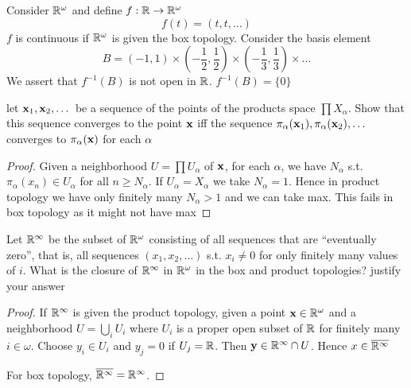 \documentclass[11pt]{article}
\begin{document}
\begin{examplle}[]
Consider \(\mathbb{R}^\omega\) and define \(f:\mathbb{R}\to\mathbb{R}^\omega\)
\begin{equation*}
f(t)=(t,t,\dots)
\end{equation*}
\(f\) is continuous if \(\mathbb{R}^\omega\) is given the box topology. Consider the basis element
\begin{equation*}
B=(-1,1)\times(-\frac{1}{2},\frac{1}{2})\times(-\frac{1}{3},\frac{1}{3})\times\dots
\end{equation*}
We assert that \(f^{-1}(B)\) is not open in \(\mathbb{R}\). \(f^{-1}(B)=\{0\}\)
\end{examplle}

\begin{exercise}
\label{ex19.6}
let \(\operatorname{\textbf{x}}_1,\operatorname{\textbf{x}}_2,\dots\) be a sequence of the points of the products space \(\prod X_\alpha\). Show that this
sequence converges to the point \(\operatorname{\textbf{x}}\) iff the sequence \(\pi_\alpha(\operatorname{\textbf{x}}_1),\pi_\alpha(\operatorname{\textbf{x}}_2),\dots\) converges
to \(\pi_\alpha(\operatorname{\textbf{x}})\) for each \(\alpha\)
\end{exercise}

\begin{proof}
Given a neighborhood \(U=\prod U_\alpha\) of \(\operatorname{\textbf{x}}\), for each \(\alpha\), we have \(N_\alpha\) s.t. \(\pi_\alpha(x_n)\in U_\alpha\) for
all \(n\ge N_\alpha\). If \(U_\alpha=X_\alpha\) we take \(N_\alpha=1\). Hence in product topology we have only finitely
many \(N_\alpha>1\) and we can take max. This fails in box topology as it might not have max
\end{proof}

\begin{exercise}
\label{ex19.7}
Let \(\mathbb{R}^\infty\) be the subset of \(\mathbb{R}^\omega\) consisting of all sequences that are ``eventually zero'', that
is, all sequences \((x_1,x_2,\dots)\) s.t. \(x_i\neq0\) for only finitely many values of \(i\). What is
the closure of \(\mathbb{R}^\infty\) in \(\mathbb{R}^\omega\) in the box and product topologies? justify your answer
\end{exercise}

\begin{proof}


If \(\mathbb{R}^\infty\) is given the product topology, given a point \(\operatorname{\textbf{x}}\in\mathbb{R}^\omega\) and a neighborhood \(U=\bigcup_i U_i\)
where \(U_i\) is a proper open subset of \(\mathbb{R}\) for finitely many \(i\in\omega\). Choose \(y_i\in U_i\)
and \(y_j=0\) if \(U_j=\mathbb{R}\). Then \(\operatorname{\textbf{y}}\in\mathbb{R}^\infty\cap U\). Hence \(x\in\overline{\mathbb{R}^\infty}\)

For box topology, \(\overline{\mathbb{R}^{\infty}}=\mathbb{R}^\infty\).
\end{proof}
\end{document}
